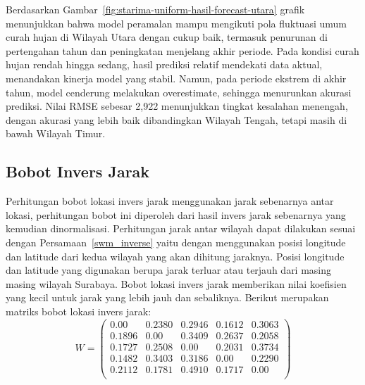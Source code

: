 \begin{enumerate}[label=\Alph*.]
    Berdasarkan Gambar~\ref{fig:starima-uniform-hasil-forecast-utara} grafik menunjukkan bahwa model peramalan mampu mengikuti pola fluktuasi umum curah hujan di Wilayah Utara dengan cukup baik, termasuk penurunan di pertengahan tahun dan peningkatan menjelang akhir periode.
    Pada kondisi curah hujan rendah hingga sedang, hasil prediksi relatif mendekati data aktual, menandakan kinerja model yang stabil.
    Namun, pada periode ekstrem di akhir tahun, model cenderung melakukan overestimate, sehingga menurunkan akurasi prediksi.
    Nilai RMSE sebesar 2,922 menunjukkan tingkat kesalahan menengah, dengan akurasi yang lebih baik dibandingkan Wilayah Tengah, tetapi masih di bawah Wilayah Timur.
\end{enumerate}
\subsection{Bobot Invers Jarak}
Perhitungan bobot lokasi invers jarak menggunakan jarak sebenarnya antar lokasi, perhitungan bobot ini diperoleh dari hasil invers jarak sebenarnya yang kemudian dinormalisasi.
Perhitungan jarak antar wilayah dapat dilakukan sesuai dengan Persamaan~\ref{swm_inverse} yaitu dengan menggunakan posisi longitude dan latitude dari kedua wilayah yang akan dihitung jaraknya.
Posisi longitude dan latitude yang digunakan berupa jarak terluar atau terjauh dari masing masing wilayah Surabaya.
Bobot lokasi invers jarak memberikan nilai koefisien yang kecil untuk jarak yang lebih jauh dan sebaliknya.
Berikut merupakan matriks bobot lokasi invers jarak:
\begin{equation}
    \label{swm-bobot-inverse}
    W = 
    \begin{pmatrix}
        0.00 & 0.2380 & 0.2946 & 0.1612 & 0.3063 \\
        0.1896 & 0.00 & 0.3409 & 0.2637 & 0.2058 \\
        0.1727 & 0.2508 & 0.00 & 0.2031 & 0.3734 \\
        0.1482 & 0.3403 & 0.3186 & 0.00 & 0.2290 \\
        0.2112 & 0.1781 & 0.4910 & 0.1717 & 0.00 \\
    \end{pmatrix}
\end{equation}

